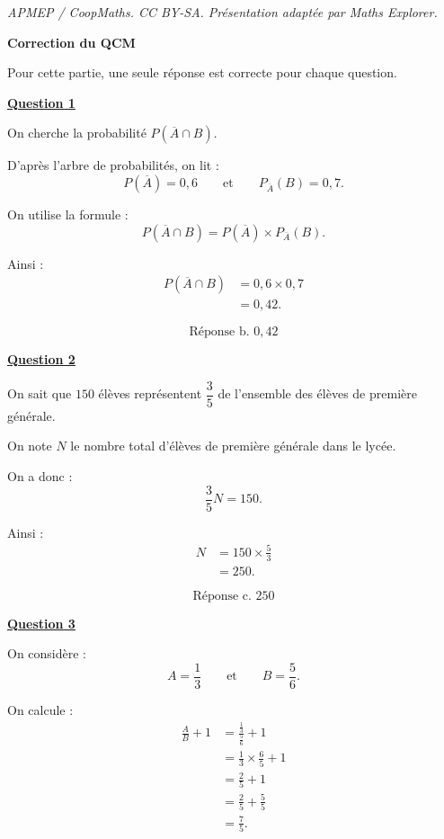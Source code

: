 \documentclass[10pt]{article}
\begin{document}
\noindent\textit{APMEP / CoopMaths. CC BY-SA. Présentation adaptée par Maths Explorer.}\par\medskip
\textbf{Correction du QCM}
			
			\medskip
			Pour cette partie, une seule réponse est correcte pour chaque question.
			
			\medskip
			\textbf{\underline{Question 1}}
			
			\medskip
			On cherche la probabilité $P(\overline{A}\cap B)$.
			
			D'après l'arbre de probabilités, on lit :
			\[
			P(\overline{A})=0{,}6
			\qquad\text{et}\qquad
			P_{\overline{A}}(B)=0{,}7.
			\]
			
			On utilise la formule :
			\[
			P(\overline{A}\cap B)=P(\overline{A})\times P_{\overline{A}}(B).
			\]
			
			Ainsi :
			\begin{align*}
				P(\overline{A}\cap B)&=0{,}6\times 0{,}7\\
				&=0{,}42.
			\end{align*}
			
			\[
			\boxed{\text{Réponse b. }0{,}42}
			\]
			
			\medskip
			\textbf{\underline{Question 2}}
			
			\medskip
			On sait que $150$ élèves représentent $\dfrac35$ de l'ensemble des élèves de première générale.
			
			On note $N$ le nombre total d'élèves de première générale dans le lycée.
			
			On a donc :
			\[
			\frac35 N=150.
			\]
			
			Ainsi :
			\begin{align*}
				N&=150\times \frac53\\
				&=250.
			\end{align*}
			
			\[
			\boxed{\text{Réponse c. }250}
			\]
			
			\medskip
			\textbf{\underline{Question 3}}
			
			\medskip
			On considère :
			\[
			A=\frac13
			\qquad\text{et}\qquad
			B=\frac56.
			\]
			
			On calcule :
			\begin{align*}
				\frac{A}{B}+1
				&=\frac{\frac13}{\frac56}+1\\
				&=\frac13\times \frac65+1\\
				&=\frac25+1\\
				&=\frac25+\frac55\\
				&=\frac75.
			\end{align*}
			
\end{document}
